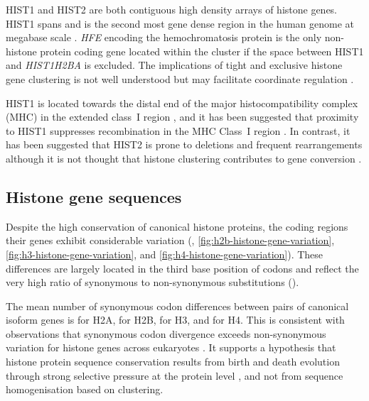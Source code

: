     HIST1 and HIST2 are both contiguous high density arrays of histone genes.
    HIST1 spans 
    and is the second most gene dense region in the human genome at
    megabase scale \citep{MHC-III-analysis}.
    \textit{HFE} encoding the hemochromatosis protein \citep{AlbigDoenecke1998}
    is the only non-histone protein coding gene located within the cluster
    if the space between HIST1 and \textit{HIST1H2BA} is excluded.
    The implications of tight and exclusive histone gene clustering
    is not well understood but may facilitate coordinate regulation
    \citep{Eirinlopez2009,close-regulators}.

    HIST1 is located towards the distal end of the major histocompatibility complex (MHC)
    in the extended class~I region \citep{MHC-I-transcript, MHC-complete-sequencing-1999},
    and it has been suggested that proximity to HIST1
    suppresses recombination in the MHC Class~I region \citep{MHC-repressed-by-HIST}.
    In contrast, it has been suggested that HIST2 is prone to
    deletions and frequent rearrangements
    \citep{HISTTwo-prone-deletion-discovery, HISTTwo-prone-deletion-focus}
    although it is not thought that histone clustering contributes to
    gene conversion \citep{NeiRooney2005}.

  \subsection{Histone gene sequences}
    Despite the high conservation of canonical histone proteins,
    the coding regions their genes exhibit considerable variation
    (, \ref{fig:h2b-histone-gene-variation},
    \ref{fig:h3-histone-gene-variation}, and \ref{fig:h4-histone-gene-variation}).
    These differences are largely located in the third base position of codons 
    and reflect the very high ratio of synonymous to non-synonymous
    substitutions ().

    The mean number of synonymous codon differences between pairs of canonical isoform genes is
     for H2A,
     for H2B,
     for H3,
    and  for H4.
    This is consistent with observations that
    synonymous codon divergence exceeds non-synonymous variation
    for histone genes across eukaryotes \citep{Piontkivska2002, Rooney2002}.
    It supports a hypothesis that histone protein sequence conservation
    results from birth and death evolution through strong selective pressure
    at the protein level \citep{NeiRooney2005},
    and not from sequence homogenisation based on clustering.

